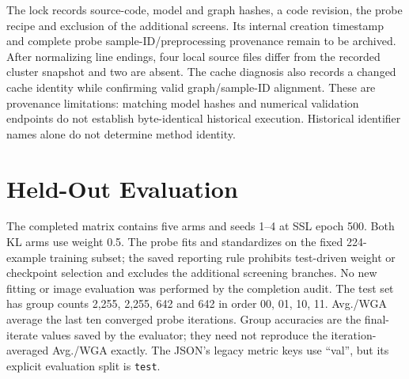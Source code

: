 \documentclass{article}
\begin{document}
The lock records source-code, model and graph hashes, a code revision, the
probe recipe and exclusion of the additional screens. Its internal creation
timestamp and complete probe sample-ID/preprocessing provenance remain to be
archived. After normalizing line endings, four local source files differ from
the recorded cluster snapshot and two are absent. The cache diagnosis also
records a changed cache identity while confirming valid graph/sample-ID
alignment. These are provenance limitations: matching model hashes and
numerical validation endpoints do not establish byte-identical historical
execution. Historical identifier names alone do not determine method identity.

\section{Held-Out Evaluation}
\label{app:test}
The completed matrix contains five arms and seeds 1--4 at SSL epoch 500.
Both KL arms use weight 0.5. The probe fits and standardizes on the fixed
224-example training subset; the saved reporting rule prohibits test-driven
weight or checkpoint selection and excludes the additional screening branches.
No new fitting or image evaluation was performed by the completion audit.
The test set has group counts 2,255, 2,255, 642 and 642 in order 00, 01, 10, 11.
Avg./WGA average the last ten converged probe iterations. Group accuracies
are the final-iterate values saved by the evaluator; they need not reproduce
the iteration-averaged Avg./WGA exactly. The JSON's legacy metric keys use
``val'', but its explicit evaluation split is \texttt{test}.
\end{document}
